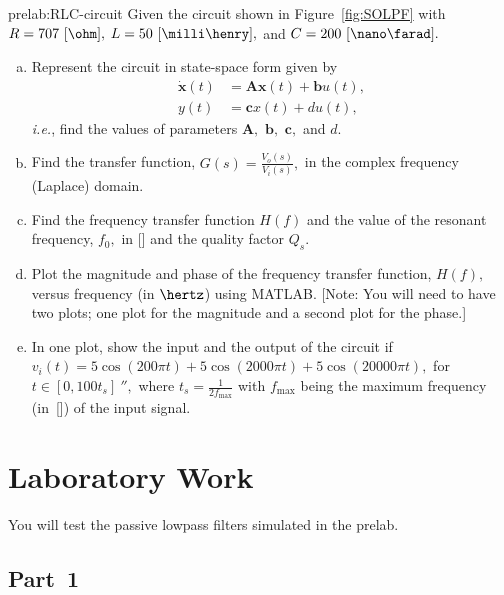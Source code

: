 \begin{prelab}{prelab:RLC-circuit}
Given the circuit shown in Figure~\ref{fig:SOLPF} with $R = 707~[\ohm],$ $L = 50~[\milli\henry],$ and $C = 200~[\nano\farad].$ 
      \begin{enumerate}[(a)]
      \item  Represent the circuit in state-space form given by 
        \begin{align*}
          \dot{\mathbf{x}}(t)& =\mathbf{A}\mathbf{x}(t) + \mathbf{b}u(t),\\
          y(t)& = \mathbf{c}x(t) + du(t),
        \end{align*}
        \textit{i.e.}, find the values of parameters $\mathbf{A},$ $\mathbf{b},$ $\mathbf{c},$ and $d.$ 
      \item Find the transfer function, $G(s) = \frac{V_o(s)}{V_i(s)},$ in the complex frequency (Laplace) domain.
        
      \item Find the frequency transfer function $H(f)$ and the value of the resonant frequency, $f_0,$ in [\hertz] and the quality factor $Q_s.$
        
      \item Plot the magnitude and phase of the frequency transfer function, $H(f),$ versus frequency (in $\hertz$) using MATLAB. [Note: You will need to have two plots; one plot for the magnitude and a second plot for the phase.]
        
      \item  In one plot, show the input and the output of the circuit if $v_i(t) = 5\cos(200\pi t) + 5\cos(2000\pi t) +5\cos(20000\pi t),$ for $t\in[0,100t_s]~\second,$ where $t_s=\frac{1}{2f_{\mathrm{max}}}$ with $f_{\mathrm{max}}$ being the maximum frequency (in~[\hertz])  of the input signal.
        \end{enumerate}
 \end{prelab}
      

\section{Laboratory Work}

You will test the passive lowpass filters simulated in the prelab. 
\subsection{Part~1}
\label{sec:part1}


